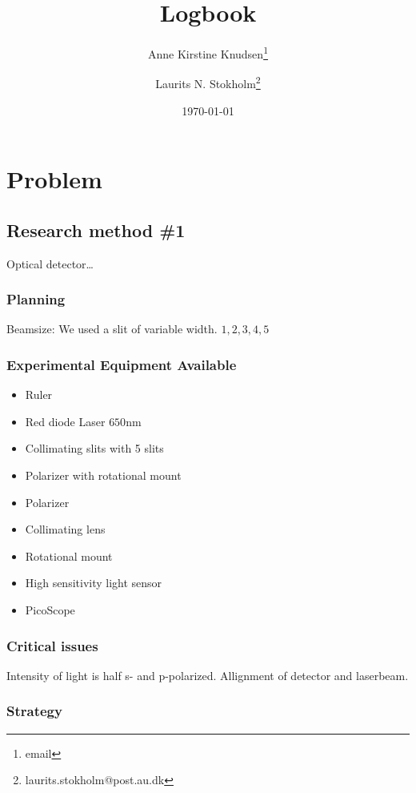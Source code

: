 \documentclass[a4paper, oneside, onecolumn, 11pt]{memoir}
\title{Logbook}
\author{Anne Kirstine Knudsen\thanks{email} \and Laurits N. Stokholm\thanks{laurits.stokholm@post.au.dk}}
\date{\today}
\begin{document}
\maketitle
\section{Problem}


\subsection{Research method \#1}
Optical detector\ldots
\subsubsection{Planning}


Beamsize: We used a slit of variable width. $1, 2, 3, 4, 5$

\subsubsection{Experimental Equipment Available}
\begin{itemize}
    \item Ruler
    \item Red diode Laser $650 \si{\nano\meter}$
    \item Collimating slits with 5 slits
    \item Polarizer with rotational mount
    \item Polarizer
    \item Collimating lens
    \item Rotational mount
    \item High sensitivity light sensor
    \item PicoScope
\end{itemize}

\subsubsection{Critical issues}
Intensity of light is half s- and p-polarized.
Allignment of detector and laserbeam.

\subsubsection{Strategy}
\end{document}
